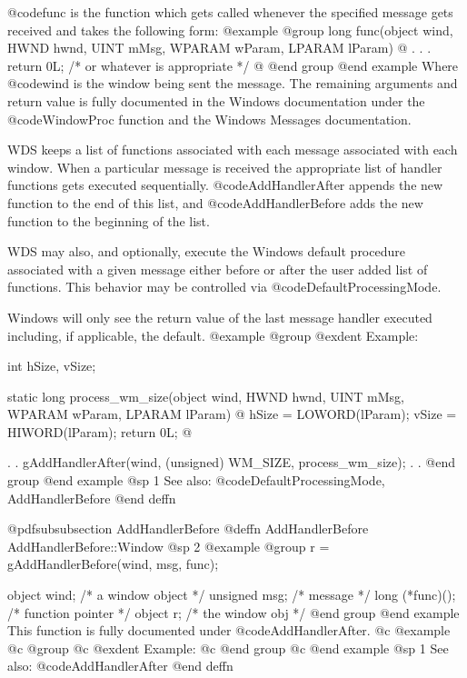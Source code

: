 @code{func} is the function which gets called whenever the specified
message gets received and takes the following form:
@example
@group
long    func(object     wind,
             HWND       hwnd, 
             UINT       mMsg, 
             WPARAM     wParam, 
             LPARAM     lParam)
@{
        .
        .
        .
        return 0L;  /* or whatever is appropriate  */
@}
@end group
@end example
Where @code{wind} is the window being sent the message.  The remaining
arguments and return value is fully documented in the Windows documentation
under the @code{WindowProc} function and the Windows Messages documentation.

WDS keeps a list of functions associated with each message associated
with each window.  When a particular message is received the appropriate
list of handler functions gets executed sequentially.
@code{AddHandlerAfter} appends the new function to the end of this list,
and @code{AddHandlerBefore} adds the new function to the beginning of
the list.

WDS may also, and optionally, execute the Windows default procedure
associated with a given message either before or after the user added
list of functions.  This behavior may be controlled via
@code{DefaultProcessingMode}.

Windows will only see the return value of the last message handler executed
including, if applicable, the default.
@example
@group
@exdent Example:

int     hSize, vSize;

static  long    process_wm_size(object  wind, 
                                HWND    hwnd, 
                                UINT    mMsg, 
                                WPARAM  wParam, 
                                LPARAM  lParam)
@{
        hSize = LOWORD(lParam);
        vSize = HIWORD(lParam);
        return 0L;
@}

        .
        .
        gAddHandlerAfter(wind, (unsigned) WM_SIZE, process_wm_size);
        .
        .
@end group
@end example
@sp 1
See also:  @code{DefaultProcessingMode, AddHandlerBefore}
@end deffn






@pdfsubsubsection {AddHandlerBefore}
@deffn {AddHandlerBefore} AddHandlerBefore::Window
@sp 2
@example
@group
r = gAddHandlerBefore(wind, msg, func);

object   wind;     /*  a window object  */
unsigned msg;      /*  message          */
long    (*func)(); /*  function pointer */
object  r;         /*  the window obj   */
@end group
@end example
This function is fully documented under @code{AddHandlerAfter}.
@c @example
@c @group
@c @exdent Example:
@c @end group
@c @end example
@sp 1
See also:  @code{AddHandlerAfter}
@end deffn







